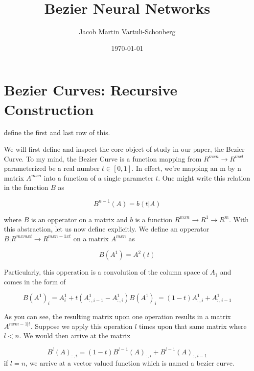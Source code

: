 \documentclass{article}
\title{Bezier Neural Networks}
\author{Jacob Martin Vartuli-Schonberg}
\date{\today}
\begin{document}
\maketitle
\tableofcontents
\newpage

\section{Bezier Curves: Recursive Construction}

define the first and last row of this.

We will first define and inspect the core object of study in our paper, the Bezier Curve. To my mind,
the Bezier Curve is a function mapping from \( R^{m x n} \to R^{m x t} \) parameterized be a real number \(t \in [0,1]\).
In effect, we're mapping an m by n matrix \(A^{m x n}\) into a function of a single parameter \(t\). One might write this
relation in the function \(B\) as

\begin{equation} \label{1} B^{n-1}(A) = b(t|A) \end{equation}

where \(B\) is an opperator on a matrix and \(b\) is a function \( R^{m x n} \to R^{1} \to R^{m} \). With this abstraction, 
let us now define explicitly. We define an opperator \(B | R^{m x m x t} \to R^{m x {n-1 x t}}\) on a matrix \(A^{m x n}\) as 

\begin{equation} B(A^1) = A^2(t) \end{equation}

Particularly, this opperation is a convolution of the column space of \(A_1\) and comes in the form of

\begin{subequations}
  \begin{equation}
    B(A^1)_i = A^1_i + t(A^1_{:,i-1} - A^1_{:,i})
  \end{equation}
  \begin{equation}
    B(A^1)_i = (1 - t)A^1_{:,i} + A^1_{:,i-1}
  \end{equation}
\end{subequations}

As you can see, the resulting matrix upon one operation results in a matrix \(A^{nxm-1|t} \). Suppose we apply this operation
\(l\) times upon that same matrix where \(l < n\). We would then arrive at the matrix 

\begin{equation}
  B^l(A)_{:, i} = (1-t)B^{l-1}(A)_{:,i} + B^{l-1}(A)_{:,i-1}
\end{equation}
if \(l = n\), we arrive at a vector valued function which is named a bezier curve.
\end{document}
